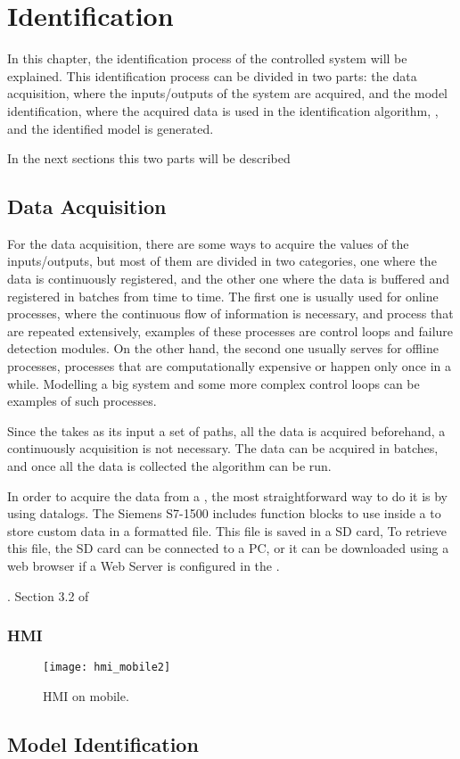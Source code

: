 
\chapter{Identification}
\label{cha:ident}
In this chapter, the identification process of the controlled system will be
explained. This identification process can be divided in two parts: the data acquisition, where the inputs\slash outputs of the system are
  acquired, and the model identification, where the acquired data is
  used in the identification algorithm, , and the
  identified model is generated.
  
In the next sections this two parts will be described

\section{Data Acquisition}
For the data acquisition, there are some ways to acquire the values of the
inputs\slash outputs, but most of them are divided in two categories, one where
the data is continuously registered, and the other one where the data is buffered
and registered in batches from time to time.
The first one is usually used for online processes, where the continuous flow of
information is necessary, and process that are repeated
extensively, examples of these processes are control loops and failure
detection modules. On the other hand, the second one usually serves for offline
processes, processes that are computationally expensive or happen only once in a
while. Modelling a big system and some more complex control loops can be examples of
such processes. 

Since the
 takes as its input a set of paths, all the data is
acquired beforehand, a continuously acquisition is not necessary. The data can
be acquired in batches, and once all the data is collected the algorithm can be
run.

In order to acquire the data from a \PLC{}, the most straightforward way to do
it is by using datalogs. The Siemens \PLC{} S7-1500 includes function blocks to
use inside a \LD{} to store custom data in a \CSV{} formatted file. This file is
saved in a SD card, To retrieve this file, the SD card can be connected to a PC,
or it can be downloaded using a web browser if a Web Server is configured in the
\PLC.




. Section 3.2 of \cite{datalogSiemens}

\subsection{HMI}
\cite{webserverSiemens,userdefinedwebpagesSiemens}
\begin{figure}[H]
  \centering
 \texttt{[image: hmi\_mobile2]}
  \caption{HMI on mobile.}
  \label{fig:hmi_mobile}
\end{figure}
\section{Model Identification}





